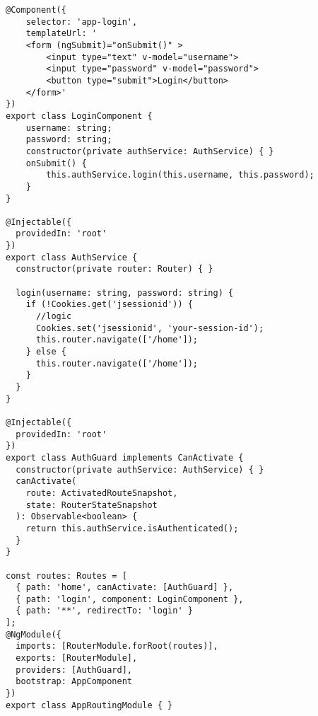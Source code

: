 \documentclass{article}
\begin{document}
\begin{lstlisting}[frame=single, basicstyle=\ttfamily, breaklines=true, breakatwhitespace=true, postbreak=\mbox{\textcolor{red}{$\hookrightarrow$}\space}]
@Component({
    selector: 'app-login',
    templateUrl: '
    <form (ngSubmit)="onSubmit()" >
        <input type="text" v-model="username">
        <input type="password" v-model="password">
        <button type="submit">Login</button>
    </form>'
})
export class LoginComponent {
    username: string;
    password: string;
    constructor(private authService: AuthService) { }
    onSubmit() {
        this.authService.login(this.username, this.password);
    }
}

@Injectable({
  providedIn: 'root'
})
export class AuthService {
  constructor(private router: Router) { }

  login(username: string, password: string) {
    if (!Cookies.get('jsessionid')) {
      //logic
      Cookies.set('jsessionid', 'your-session-id');
      this.router.navigate(['/home']);
    } else {
      this.router.navigate(['/home']);
    }
  }
}

@Injectable({
  providedIn: 'root'
})
export class AuthGuard implements CanActivate {
  constructor(private authService: AuthService) { }
  canActivate(
    route: ActivatedRouteSnapshot,
    state: RouterStateSnapshot
  ): Observable<boolean> {
    return this.authService.isAuthenticated();
  }
}

const routes: Routes = [
  { path: 'home', canActivate: [AuthGuard] },
  { path: 'login', component: LoginComponent },
  { path: '**', redirectTo: 'login' }
];
@NgModule({
  imports: [RouterModule.forRoot(routes)],
  exports: [RouterModule],
  providers: [AuthGuard],
  bootstrap: AppComponent
})
export class AppRoutingModule { }
\end{lstlisting}
\end{document}
